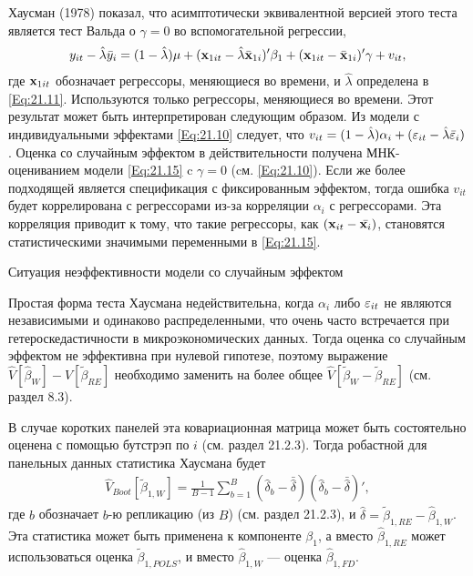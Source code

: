 Хаусман (1978) показал, что асимптотически эквивалентной версией этого теста является тест Вальда о $\gamma=0$ во вспомогательной регрессии,
\begin{align}
y_{it}-\hat{\lambda}\bar{y}_i=(1-\hat{\lambda})\mu + (\mathbf{x}_{1it}-\hat{\lambda}\bar{\mathbf{x}}_{1i})'\beta_1+(\mathbf{x}_{1it}-\bar{\mathbf{x}}_{1i})'\gamma+v_{it},
\label{Eq:21.15}
\end{align}
где $\mathbf{x}_{1it}$ обозначает регрессоры, меняющиеся во времени, и $\hat{\lambda}$ определена в \ref{Eq:21.11}. Используются только регрессоры, меняющиеся во времени. Этот результат может быть интерпретирован следующим образом. Из модели с индивидуальными эффектами \ref{Eq:21.10} следует, что $v_{it}=(1-\hat{\lambda})\alpha_i+(\varepsilon_{it}-\hat{\lambda}\bar{\varepsilon}_i)$. Оценка со случайным эффектом в действительности получена МНК-оцениванием модели \ref{Eq:21.15} c $\gamma=0$ (cм. \ref{Eq:21.10}). Если же более подходящей является спецификация с фиксированным эффектом, тогда ошибка $v_{it}$ будет коррелирована с регрессорами из-за корреляции $\alpha_i$ с регрессорами. Эта корреляция приводит к тому, что такие регрессоры, как $(\mathbf{x}_{it}-\bar{\mathbf{x}_i})$, становятся статистическими значимыми переменными в \ref{Eq:21.15}.

{\centering
Ситуация неэффективности модели со случайным эффектом\\}

Простая форма теста Хаусмана недействительна, когда $\alpha_i$ либо $\varepsilon_{it}$ не являются независимыми и одинаково распределенными, что очень часто встречается при гетероскедастичности в микроэкономических данных. Тогда оценка со случайным эффектом не эффективна при нулевой гипотезе, поэтому выражение $\hat{V}[\hat{\beta}_W]-\hat{V}[\tilde{\beta}_{RE}]$ необходимо заменить на более общее $\hat{V}[\tilde{\beta}_W-\tilde{\beta}_{RE}]$ (см. раздел 8.3).

В случае коротких панелей эта ковариационная матрица может быть состоятельно оценена с помощью бутстрэп по $i$ (см. раздел 21.2.3). Тогда робастной для панельных данных статистика Хаусмана будет
\begin{align}
\hat{V}_{Boot}[\tilde{\beta}_{1,W}]=\frac{1}{B-1} \sum^B_{b=1} 
\left(\hat{\delta}_b-\bar{\hat{\delta}}\right)
\left(\hat{\delta}_b-\bar{\hat{\delta}}\right)',
\end{align}
где $b$ обозначает $b$-ю репликацию (из $B$) (см. раздел 21.2.3), и $\hat{\delta}=\tilde{\beta}_{1,RE}-\hat{\beta}_{1,W}$. Эта статистика может быть применена к компоненте $\beta_1$, а вместо $\hat{\beta}_{1,RE}$ может использоваться  оценка $\tilde{\beta}_{1,POLS}$, и вместо  $\hat{\beta}_{1,W}$ --- оценка $\hat{\beta}_{1,FD}$.

